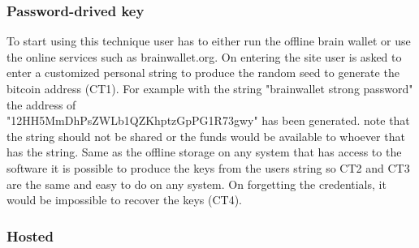 \subsubsection{Password-drived key}
To start using this technique user has to either run the offline brain wallet or use the online services such as brainwallet.org. On entering the site user is asked to enter a customized personal string to produce the random seed to generate the bitcoin address (CT1). For example with the string "brainwallet strong password" the address of \\ "12HH5MmDhPsZWLb1QZKhptzGpPG1R73gwy" has been generated. note that the string should not be shared or the funds would be available to whoever that has the string. Same as the offline storage on any system that has access to the software it is possible to produce the keys from the users string so CT2 and CT3 are the same and easy to do on any system. On forgetting the credentials, it would be impossible to recover the keys (CT4).


\subsubsection{Hosted}
